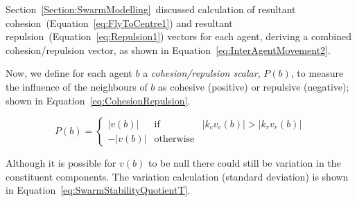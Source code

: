 \documentclass{ieeeaccess}
\begin{document}

Section~\ref{Section:SwarmModelling}~discussed calculation of resultant
cohesion~(Equation~\ref{eq:FlyToCentre1}) and resultant
repulsion~(Equation~\ref{eq:Repulsion1}) vectors for each agent, deriving a
combined cohesion/repulsion vector, as shown in
Equation~\ref{eq:InterAgentMovement2}. 


Now, we define for each agent $b$ a \textit{cohesion/repulsion scalar}, $P(b)$,
to measure the influence of the neighbours of $b$ as cohesive (positive) or
repulsive (negative); shown in Equation~\ref{eq:CohesionRepulsion}.

\begin{equation}
\label{eq:CohesionRepulsion}
P(b) = \left\{\begin{array}{lll}
               |v(b)|& \mathrm{if} & |k_cv_c(b)| > |k_r v_r(b)|\\
              -|v(b)|& \mathrm{otherwise}
              \end{array}\right.
\end{equation}

Although it is possible for $v(b)$ to be null there could still be variation in
the constituent components. The variation calculation (standard deviation) is
shown in Equation~\ref{eq:SwarmStabilityQuotientT}. 


\end{document}
